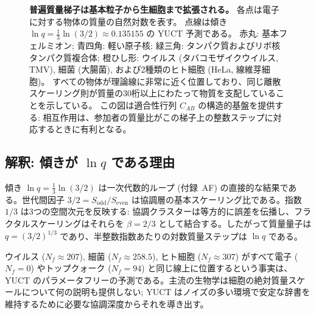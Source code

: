 \documentclass[11pt,a4paper]{article}
\theoremstyle{remark}
\begin{document}
\begin{figure}[H]
		\caption{\textbf{普遍質量梯子は基本粒子から生細胞まで拡張される。}
			各点は電子に対する物体の質量の自然対数を表す。
			点線は傾き \(\ln q = \frac{1}{3}\ln(3/2) \approx 0.135155\) の YUCT 予測である。
			赤丸: 基本フェルミオン; 青四角: 軽い原子核; 緑三角: タンパク質およびリボ核タンパク質複合体; 橙ひし形: ウイルス (タバコモザイクウイルス, TMV), 細菌 (大腸菌), および2種類のヒト細胞 (HeLa, 線維芽細胞)。
			すべての物体が理論線に非常に近く位置しており、同じ離散スケーリング則が質量の30桁以上にわたって物質を支配していることを示している。
			この図は適合性行列 \(C_{AB}\) の構造的基盤を提供する: 相互作用は、参加者の質量比がこの梯子上の整数ステップに対応するときに有利となる。}
		\label{fig:ladder_cells}
	\end{figure}
	
	\subsection{解釈: 傾きが \(\ln q\) である理由}
	
	傾き \(\ln q = \frac{1}{3}\ln(3/2)\) は一次代数的ループ (付録~AF) の直接的な結果である。世代間因子 \(3/2 = S_{\mathrm{odd}}/S_{\mathrm{even}}\) は協調層の基本スケーリング比である。指数 \(1/3\) は3つの空間次元を反映する: 協調クラスターは等方的に誤差を伝播し、フラクタルスケーリングはそれらを \(\beta = 2/3\) として結合する。したがって質量量子は \(q = (3/2)^{1/3}\) であり、半整数指数あたりの対数質量ステップは \(\ln q\) である。
	
	ウイルス (\(N_f \approx 207\)), 細菌 (\(N_f \approx 258.5\)), ヒト細胞 (\(N_f \approx 307\)) がすべて電子 (\(N_f = 0\)) やトップクォーク (\(N_f = 94\)) と同じ線上に位置するという事実は、YUCT のパラメータフリーの予測である。主流の生物学は細胞の絶対質量スケールについて何の説明も提供しない; YUCT はノイズの多い環境で安定な辞書を維持するために必要な協調深度からそれを導き出す。
	
\end{document}
